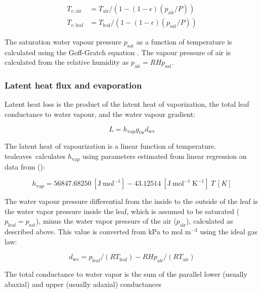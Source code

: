\documentclass[11pt, oneside]{article}
\newcommand{\pkg}[1]{{\fontseries{b}\selectfont #1}}
\newcommand{\tealeaves}{\pkg{tealeaves}}
\begin{document}
\begin{align}
  T_{v, \mathrm{air}} & = T_\mathrm{air} / (1 - (1 - \epsilon) (p_\mathrm{air} / P)) \\
  T_{v, \mathrm{leaf}} & = T_\mathrm{leaf} / (1 - (1 - \epsilon) (p_\mathrm{sat} / P))
\end{align}

The saturation water vapour pressure $p_\mathrm{sat}$ as a function of temperature is calculated using the Goff-Gratch equation \citep{Vomel_2016}. The vapour pressure of air is calculated from the relative humidity as $p_\mathrm{air} = \mathit{RH} p_\mathrm{sat}$.

\subsubsection*{Latent heat flux and evaporation}

Latent heat loss is the product of the latent heat of vaporization, the total leaf conductance to water vapour, and the water vapour gradient:

\begin{equation}
  L = h_\mathrm{vap} g_\mathrm{tw} d_\mathrm{wv}
\end{equation}

The latent heat of vapourization is a linear function of temperature. \tealeaves~calculates $h_\mathrm{vap}$ using parameters estimated from linear regression on data from \citeauthor{Nobel_2009} (\citeyear{Nobel_2009}):

\begin{equation}
  h_\mathrm{vap} = 56847.68250~[\mathrm{J~mol}^{-1}] - 43.12514~[\mathrm{J~mol}^{-1}~\mathrm{K}^{-1}]~T~[K]
\end{equation}

The water vapour pressure differential from the inside to the outside of the leaf is the water vapor pressure inside the leaf, which is assumed to be saturated ($p_\mathrm{leaf} = p_\mathrm{sat}$), minus the water vapor pressure of the air ($p_\mathrm{air}$), calculated as described above. This value is converted from kPa to mol m$^{-3}$ using the ideal gas law:

\begin{equation}
  \label{eq:d_wv}
  d_\mathrm{wv} = p_\mathrm{leaf} / (R T_\mathrm{leaf}) - RH p_\mathrm{air} / (R T_\mathrm{air})
\end{equation}

The total conductance to water vapor is the sum of the parallel lower (usually abaxial) and upper (usually adaxial) conductances
\end{document}
